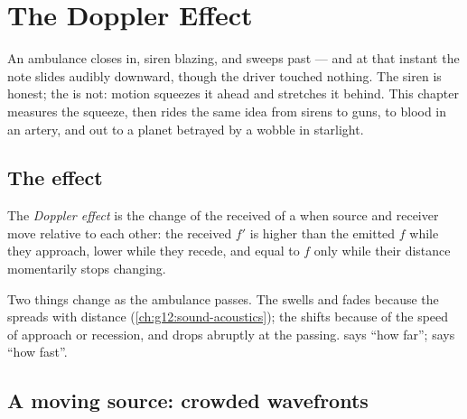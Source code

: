 \chapter{The Doppler Effect}\label{ch:g12:doppler-effect}

An ambulance closes in, siren blazing, and sweeps past --- and at that instant the note
slides audibly downward, though the driver touched nothing. The siren is honest; the 
is not: motion squeezes it ahead and stretches it behind. This chapter measures the squeeze,
then rides the same idea from sirens to  guns, to blood in an artery, and out to a
planet betrayed by a wobble in starlight.

\section{The effect}

\begin{definition}\label{def:g12:doppler-effect:doppler}
The \emph{Doppler effect} is the change of the received 
of a  when source and receiver move relative to each other: the received 
$f'$ is higher than the emitted  $f$ while they approach, lower while they
recede, and equal to $f$ only while their distance momentarily stops changing.
\end{definition}

\begin{remark}\label{rem:g12:doppler-effect:pitch}
Two things change as the ambulance passes. The \emph{} swells and fades because
the  spreads with distance (\cref{ch:g12:sound-acoustics}); the \emph{} shifts
because of the speed of approach or recession, and drops abruptly at the passing.
 says ``how far'';  says ``how fast''.
\end{remark}

\section{A moving source: crowded wavefronts}

